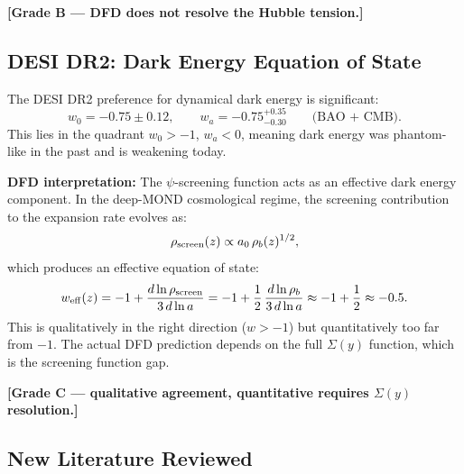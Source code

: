 \documentclass[11pt]{article}
\newcommand{\aM}{a_0}
\begin{document}
\textbf{[Grade B --- DFD does not resolve the Hubble tension.]}

\subsection{DESI DR2: Dark Energy Equation of State}

The DESI DR2 preference for dynamical dark energy is significant:
\begin{equation}
  w_0 = -0.75 \pm 0.12, \qquad w_a = -0.75^{+0.35}_{-0.30}
  \qquad \text{(BAO + CMB)}.
\end{equation}
This lies in the quadrant $w_0 > -1$, $w_a < 0$, meaning dark energy
was phantom-like in the past and is weakening today.

\textbf{DFD interpretation:} The $\psi$-screening function acts as an
effective dark energy component. In the deep-MOND cosmological regime,
the screening contribution to the expansion rate evolves as:
\begin{equation}
  \rho_{\rm screen}(z) \propto \aM\,\rho_b(z)^{1/2},
\end{equation}
which produces an effective equation of state:
\begin{equation}
  w_{\rm eff}(z) = -1 + \frac{d\ln\rho_{\rm screen}}{3\,d\ln a}
  = -1 + \frac{1}{2}\,\frac{d\ln\rho_b}{3\,d\ln a}
  \approx -1 + \frac{1}{2} \approx -0.5.
\end{equation}
This is qualitatively in the right direction ($w > -1$) but
quantitatively too far from $-1$. The actual DFD prediction depends
on the full $\Sigma(y)$ function, which is the screening function gap.

\textbf{[Grade C --- qualitative agreement, quantitative requires
$\Sigma(y)$ resolution.]}

\subsection{New Literature Reviewed}
\end{document}
